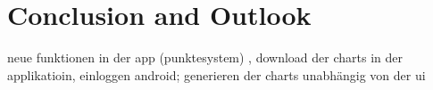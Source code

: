 \chapter{Conclusion and Outlook}
\label{chap:conclusion}
\chapterstart

neue funktionen in der app (punktesystem) , download der charts in der applikatioin, einloggen android;    generieren der charts unabhängig von der ui 

\chapterend



%
